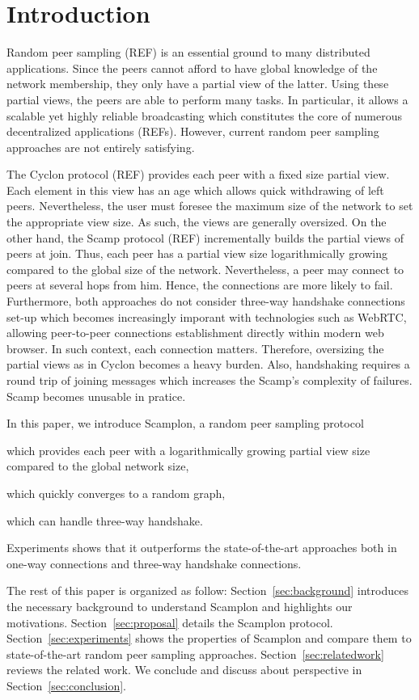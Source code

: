 
\section{Introduction}
Random peer sampling (REF) is an essential ground to many distributed
applications. Since the peers cannot afford to have global knowledge of the
network membership, they only have a partial view of the latter. Using these
partial views, the peers are able to perform many tasks. In particular, it
allows a scalable yet highly reliable broadcasting which constitutes the core
of numerous decentralized applications (REFs). However, current random peer
sampling approaches are not entirely satisfying. 

The Cyclon protocol (REF) provides each peer with a fixed size partial view.
Each element in this view has an age which allows quick withdrawing of left
peers. Nevertheless, the user must foresee the maximum size of the network to
set the appropriate view size. As such, the views are generally oversized. On
the other hand, the Scamp protocol (REF) incrementally builds the partial views
of peers at join. Thus, each peer has a partial view size logarithmically
growing compared to the global size of the network. Nevertheless, a peer may
connect to peers at several hops from him. Hence, the connections are more
likely to fail.  Furthermore, both approaches do not consider three-way
handshake connections set-up which becomes increasingly imporant with
technologies such as WebRTC, allowing peer-to-peer connections establishment
directly within modern web browser. In such context, each connection
matters. Therefore, oversizing the partial views as in Cyclon becomes a heavy
burden. Also, handshaking requires a round trip of joining messages which
increases the Scamp's complexity of failures. Scamp becomes unusable in
pratice.

In this paper, we introduce Scamplon, a random peer sampling protocol
\begin{inparaenum}[(i)]
\item which provides each peer with a logarithmically growing partial view size
  compared to the global network size,
\item which quickly converges to a random graph,
\item which can handle three-way handshake.
\end{inparaenum}
Experiments shows that it outperforms the state-of-the-art approaches both in
one-way connections and three-way handshake connections.

The rest of this paper is organized as follow: Section~\ref{sec:background}
introduces the necessary background to understand Scamplon and highlights our
motivations. Section~\ref{sec:proposal} details the Scamplon protocol.
Section~\ref{sec:experiments} shows the properties of Scamplon and compare them
to state-of-the-art random peer sampling
approaches. Section~\ref{sec:relatedwork} reviews the related work. We conclude
and discuss about perspective in Section~\ref{sec:conclusion}.

